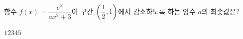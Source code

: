 함수 $f(x)=\dfrac{e^x}{ax^2+3}$이 구간 $\left(\dfrac{1}{2}{,}\mkern3mu\mathopen{}1\right)$에서 감소하도록 하는 양수 $a$의 최솟값은?
\begin{choices32}{$1$}{$2$}{$3$}{$4$}{$5$}\end{choices32}

